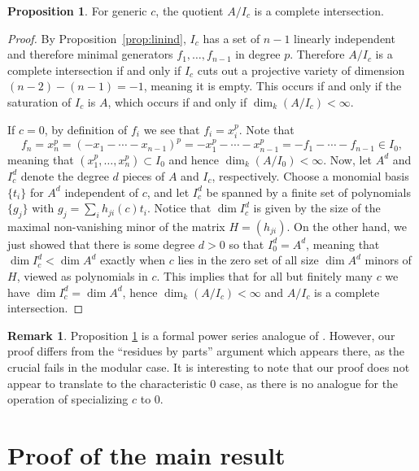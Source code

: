 \documentclass{amsart}
\numberwithin{equation}{section}
\theoremstyle{definition}
\newtheorem{proposition}[theorem]{Proposition}
\newtheorem*{remark}{Remark}
\begin{document}
\begin{proposition}\label{prop:ci}
For generic $c$, the quotient $A/I_c$ is a complete intersection. 
\end{proposition}
\begin{proof}
By Proposition~\ref{prop:linind}, $I_c$ has a set of $n-1$ linearly independent and therefore minimal generators $f_1, \ldots, f_{n-1}$ in degree $p$.  Therefore $A/I_c$ is a complete intersection if and only if $I_c$ cuts out a projective variety of dimension $(n - 2) - (n - 1) = -1$, meaning it is empty.  This occurs if and only if the saturation of $I_c$ is $A$, which occurs if and only if $\dim_k(A/I_c) < \infty$.

If $c = 0$, by definition of $f_i$ we see that $f_i = x_i^p$.  Note that 
\[
f_n = x_n^p = (-x_1 - \cdots - x_{n-1})^p = - x_1^p - \cdots - x_{n - 1}^p = - f_1 - \cdots - f_{n -1} \in I_0,
\]
meaning that $(x_1^p, \ldots, x_n^p) \subset I_0$ and hence $\dim_k(A/I_0) < \infty$.  Now, let $A^d$ and $I_c^d$ denote the degree $d$ pieces of $A$ and $I_c$, respectively.  Choose a monomial basis $\{t_i\}$ for $A^d$ independent of $c$, and let $I_c^d$ be spanned by a finite set of polynomials $\{g_j\}$ with $g_j = \sum_i h_{ji}(c) t_i$.  Notice that $\dim I_c^d$ is given by the size of the maximal non-vanishing minor of the matrix $H = (h_{ji})$.  On the other hand, we just showed that there is some degree $d > 0$ so that $I_0^d = A^d$, meaning that $\dim I_c^d < \dim A^d$ exactly when $c$ lies in the zero set of all size $\dim A^d$ minors of $H$, viewed as polynomials in $c$.  This implies that for all but finitely many $c$ we have $\dim I_c^d = \dim A^d$, hence $\dim_k(A/I_c) < \infty$ and $A/I_c$ is a complete intersection.
\end{proof}

\begin{remark}
Proposition \ref{prop:ci} is a formal power series analogue of \cite[Theorem 3.2]{CE}.  However, our proof differs from the ``residues by parts'' argument which appears there, as the crucial \cite[Lemma 3.2]{CE} fails in the modular case.  It is interesting to note that our proof does not appear to translate to the characteristic $0$ case, as there is no analogue for the operation of specializing $c$ to $0$.
\end{remark}

\section{Proof of the main result}
\end{document}
